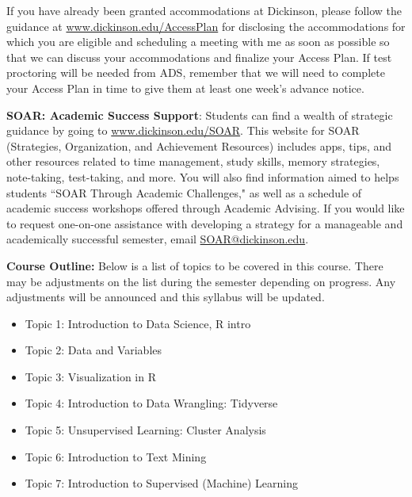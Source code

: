 \documentclass[11pt,letter]{article}
\begin{document}
If you have already been granted accommodations at Dickinson, please follow the guidance at \url{www.dickinson.edu/AccessPlan} for disclosing the accommodations for which you are eligible and scheduling a meeting with me as soon as possible so that we can discuss your accommodations and finalize your Access Plan. If test proctoring will be needed from ADS, remember that we will need to complete your Access Plan in time to give them at least one week’s advance notice.

\textbf{SOAR: Academic Success Support}: Students can find a wealth of strategic guidance by going to \url{www.dickinson.edu/SOAR}. This website for SOAR (Strategies, Organization, and Achievement Resources) includes apps, tips, and other resources related to time management, study skills, memory strategies, note-taking, test-taking, and more. You will also find information aimed to helps students ``SOAR Through Academic Challenges," as well as a schedule of academic success workshops offered through Academic Advising. If you would like to request one-on-one assistance with developing a strategy for a manageable and academically successful semester, email \url{SOAR@dickinson.edu}.

\textbf{Course Outline:} Below is a list of topics to be covered in this course. There may be adjustments on the list during the semester depending on progress. Any adjustments will be announced and this syllabus will be updated. \vspace{-2mm}
\begin{itemize}
	\item Topic 1: Introduction to Data Science, R intro
	\item Topic 2: Data and Variables
	\item Topic 3: Visualization in R
	\item Topic 4: Introduction to Data Wrangling: Tidyverse
	\item Topic 5: Unsupervised Learning: Cluster Analysis
  \item Topic 6: Introduction to Text Mining
	\item Topic 7: Introduction to Supervised (Machine) Learning
\end{itemize}

\vspace{.2cm}
\end{document}

